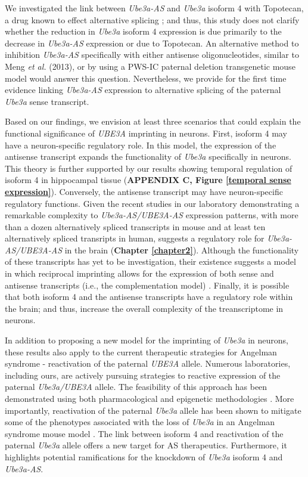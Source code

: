 We investigated the link between \textit{Ube3a-AS} and \textit{Ube3a} isoform 4 with Topotecan, a drug known to effect alternative splicing \cite{Shkreta2008,Powell2013b}; and thus, this study does not clarify whether the reduction in \textit{Ube3a} isoform 4 expression is due primarily to the decrease in \textit{Ube3a-AS} expression or due to Topotecan. An alternative method to inhibition \textit{Ube3a-AS} specifically with either antisense oligonucleotides, similar to Meng \textit{et al.} (2013), or by using a PWS-IC paternal deletion transgenetic mouse model would answer this question. Nevertheless, we provide for the first time evidence linking \textit{Ube3a-AS} expression to alternative splicing of the paternal \textit{Ube3a} sense transcript.

Based on our findings, we envision at least three scenarios that could explain the functional significance of \textit{UBE3A} imprinting in neurons. First, isoform 4 may have a neuron-specific regulatory role. In this model, the expression of the antisense transcript expands the functionality of \textit{Ube3a} specifically in neurons.
This theory is further supported by our results showing temporal regulation of isoform 4 in hippocampal tissue (\textbf{APPENDIX C, Figure \ref{temporal sense expression}}).
Conversely, the antisense transcript may have neuron-specific regulatory functions. Given the recent studies in our laboratory demonstrating a remarkable complexity to \textit{Ube3a-AS/UBE3A-AS} expression patterns, with more than a dozen alternatively spliced transcripts in mouse and at least ten alternatively spliced transripts in human, suggests a regulatory role for \textit{Ube3a-AS/UBE3A-AS} in the brain (\textbf{Chapter \ref{chapter2}}). Although the functionality of these transcripts has yet to be investigation, their existence suggests a model in which reciprocal imprinting allows for the expression of both sense and antisense transcripts (i.e., the complementation model) \cite{Kaneko-Ishino2006,Kaneko-Ishino2003}.
Finally, it is possible that both isoform 4 and the antisense transcripts have a regulatory role within the brain; and thus, increase the overall complexity of the treanscriptome in neurons.

In addition to proposing a new model for the imprinting of \textit{Ube3a} in neurons, these results also apply to the current therapeutic strategies for Angelman syndrome - reactivation of the paternal \textit{UBE3A} allele. Numerous laboratories, including ours, are actively pursuing strategies to reactive expression of the paternal \textit{Ube3a/UBE3A} allele. The feasibility of this approach has been demonstrated using both pharmacological and epigenetic methodologies \cite{Huang2012,Meng2015,Bailus2016}.  More importantly, reactivation of the paternal \textit{Ube3a} allele has been shown to mitigate some of the phenotypes associated with the loss of \textit{Ube3a} in an Angelman syndrome mouse model \cite{Meng2015,Shi2015}. The link between isoform 4 and reactivation of the paternal \textit{Ube3a} allele offers a new target for AS therapeutics. Furthermore, it highlights potential ramifications for the knockdown of \textit{Ube3a} isoform 4 and \textit{Ube3a-AS}.
